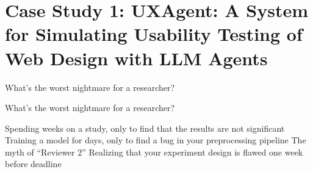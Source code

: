 \documentclass[scheme=plain,aspectratio=169]{beamer}
\begin{document}







\section[Case Study 1: UXAgent]{Case Study 1: UXAgent: A System for Simulating Usability Testing of Web Design with LLM Agents}

\begin{frame}[standout]
  What’s the worst nightmare for a researcher?
\end{frame}

\begin{frame}{What’s the worst nightmare for a researcher?}
  \begin{outline}
    \1 Spending weeks on a study, only to find that the results are not significant
    \1 Training a model for days, only to find a bug in your preprocessing pipeline
    \1 The myth of ``Reviewer 2''
    \pause
    \1 Realizing that your experiment design is flawed one week before deadline
  \end{outline}
\end{frame}
\end{document}
